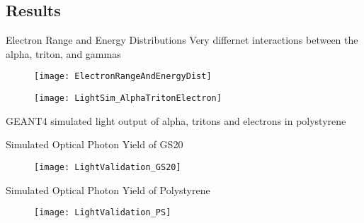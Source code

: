 \subsection{Results}
\begin{frame}{Electron Range and Energy Distributions}
  Very differnet interactions between the alpha, triton, and gammas
  \begin{figure}
    \centering
    \texttt{[image: ElectronRangeAndEnergyDist]}
  \end{figure}
\end{frame}
\begin{frame}
  \label{EDepScint}
  \begin{figure}
    \centering
    \texttt{[image: LightSim\_AlphaTritonElectron]}
  \end{figure}
  GEANT4 simulated light output of alpha, tritons and electrons in polystyrene
  \hyperlink{ScintEnergyDep}{}
\end{frame}
\begin{frame}{Simulated Optical Photon Yield of GS20}
  \begin{figure}
    \centering
    \texttt{[image: LightValidation\_GS20]}
  \end{figure}
\end{frame}
\begin{frame}{Simulated Optical Photon Yield of Polystyrene}
  \begin{figure}
    \centering
    \texttt{[image: LightValidation\_PS]}
  \end{figure}
  \vspace{2.5cm}
\end{frame}
